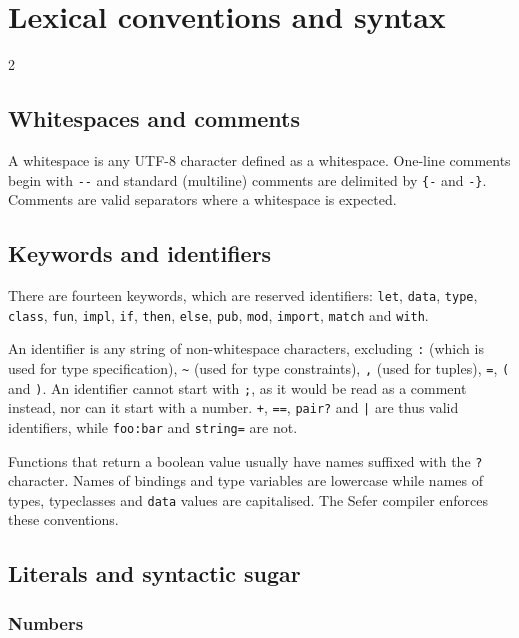 \chapter{Lexical conventions and syntax}

\begin{multicols*}{2}

  \section{Whitespaces and comments}

  A whitespace is any UTF-8 character defined as a
  whitespace. One-line comments begin with \verb|--| and standard
  (multiline) comments are delimited by \verb|{-| and
  \verb|-}|. Comments are valid separators where a whitespace is
  expected.

  \section{Keywords and identifiers}

  There are fourteen keywords, which are reserved identifiers:
  \verb|let|, \verb|data|, \verb|type|, \verb|class|, \verb|fun|,
  \verb|impl|, \verb|if|, \verb|then|, \verb|else|, \verb|pub|,
  \verb|mod|, \verb|import|, \verb|match| and \verb|with|.

  An identifier is any string of non-whitespace characters, excluding
  \verb|:| (which is used for type specification), \verb|~| (used for
  type constraints), \verb|,| (used for tuples), \verb|=|, \verb|(|
  and \verb|)|. An identifier cannot start with \verb|;|, as it would
  be read as a comment instead, nor can it start with a
  number. \verb|+|, \verb|==|, \verb|pair?| and \verb+|+ are thus
  valid identifiers, while \verb|foo:bar| and \verb|string=| are not.

  Functions that return a boolean value usually have names suffixed with
  the \verb|?| character. Names of bindings and type variables are
  lowercase while names of types, typeclasses and \verb|data| values are
  capitalised. The Sefer compiler enforces these conventions.

  \section{Literals and syntactic sugar}

  \subsection{Numbers}


\end{multicols*}
